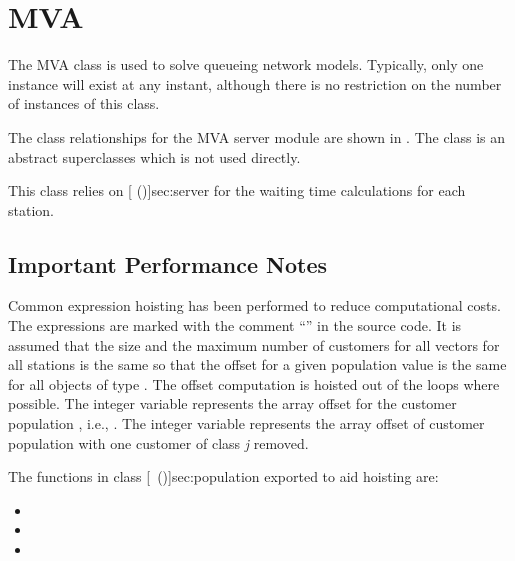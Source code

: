 % 
\section{MVA}
\label{sec:mva}

The MVA class is used to solve queueing network models.  Typically,
only one instance will exist at any instant, although there is no
restriction on the number of instances of this class.

The class relationships for the MVA server module are shown in
.  The class  is an abstract
superclasses which is not used directly.

\begin{figure}[htbp]
  \label{fig:mva}
  \begin{center}
  \end{center}
\end{figure}

This class relies on [ (\Sec\Ref)]{sec:server} for the waiting
time calculations for each station.

\htmlrule
\subsection{Important Performance Notes}
\label{sec:mva-cautions}

Common expression hoisting has been performed to reduce computational
costs.  The expressions are marked with the comment ``''
in the source code.  It is assumed that the size and the maximum
number of customers for all 
vectors for all stations is the same so that the offset for a given
population value  is the same for all objects of type
.  The offset computation is hoisted out of the loops
where possible.  The integer variable  represents the array
offset for the customer population , i.e., .  The integer variable  represents
the array offset of customer population  with one customer of
class \emph{j} removed.  

The functions in class
[~(\Sec\Ref)]{sec:population} exported to aid
hoisting are:
\begin{itemize}
\item {}
\item {}
\item {}
\end{itemize}

